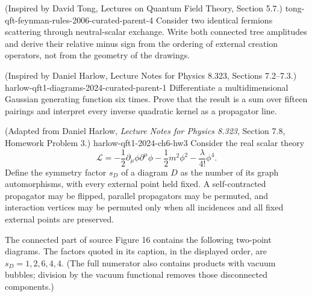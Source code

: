 \begin{enumerate}
  {(Inspired by David Tong, Lectures on Quantum Field Theory, Section 5.7.)}
  {tong-qft-feynman-rules-2006-curated-parent-4}
Consider two identical fermions scattering through neutral-scalar
exchange.  Write both connected tree amplitudes and derive their relative
minus sign from the ordering of external creation operators, not from the
geometry of the drawings.

  {(Inspired by Daniel Harlow, Lecture Notes for Physics 8.323, Sections 7.2--7.3.)}
  {harlow-qft1-diagrams-2024-curated-parent-1}
Differentiate a multidimensional Gaussian generating function six times.
Prove that the result is a sum over fifteen pairings and interpret every
inverse quadratic kernel as a propagator line.

  {(Adapted from Daniel Harlow, \emph{Lecture Notes for Physics 8.323},
  Section 7.8, Homework Problem 3.)}
  {harlow-qft1-2024-ch6-hw3}
Consider the real scalar theory
\[
 \mathcal L=-\frac12\partial_\mu\phi\partial^\mu\phi
 -\frac12m^2\phi^2-\frac{\lambda}{4!}\phi^4.
\]
Define the symmetry factor \(s_D\) of a diagram \(D\) as the number of its
graph automorphisms, with every external point held fixed.  A self-contracted
propagator may be flipped, parallel propagators may be permuted, and
interaction vertices may be permuted only when all incidences and all fixed
external points are preserved.

The connected part of source Figure 16 contains the following two-point
diagrams.  The factors quoted in its caption, in the displayed order, are
\(s_D=1,2,6,4,4\).  (The full numerator also contains products with vacuum
bubbles; division by the vacuum functional removes those disconnected
components.)


\end{enumerate}
